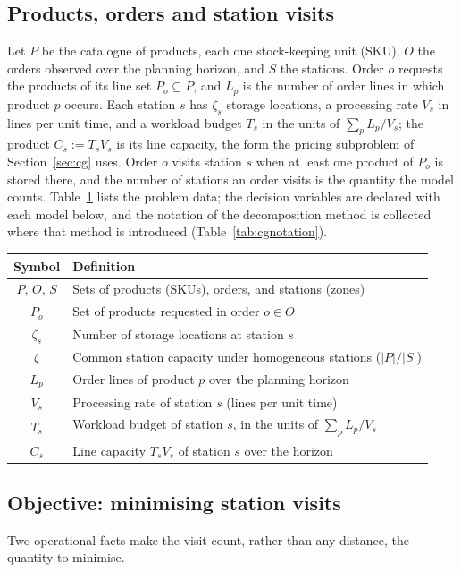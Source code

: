 \documentclass[]{interact}
\begin{document}
\subsection{Products, orders and station visits}\label{sec:sets}
Let $P$ be the catalogue of products, each one stock-keeping unit (SKU), $O$ the orders observed over the planning horizon, and $S$ the stations. Order $o$ requests the products of its line set $P_o \subseteq P$, and $L_p$ is the number of order lines in which product $p$ occurs. Each station $s$ has $\zeta_s$ storage locations, a processing rate $V_s$ in lines per unit time, and a workload budget $T_s$ in the units of $\sum_{p} L_p/V_s$; the product $C_s := T_s V_s$ is its line capacity, the form the pricing subproblem of Section~\ref{sec:cg} uses. Order $o$ visits station $s$ when at least one product of $P_o$ is stored there, and the number of stations an order visits is the quantity the model counts. Table~\ref{tab:data} lists the problem data; the decision variables are declared with each model below, and the notation of the decomposition method is collected where that method is introduced (Table~\ref{tab:cgnotation}).

\begin{table}[H]
\centering
{}
{\small\begin{tabularx}{\textwidth}{@{}c@{\hspace{2em}}X@{}}
\toprule
Symbol & Definition \\
\midrule
$P,\,O,\,S$ & Sets of products (SKUs), orders, and stations (zones) \\
$P_o$       & Set of products requested in order $o \in O$ \\
$\zeta_s$   & Number of storage locations at station $s$ \\
$\zeta$     & Common station capacity under homogeneous stations ($|P|/|S|$) \\
$L_p$       & Order lines of product $p$ over the planning horizon \\
$V_s$       & Processing rate of station $s$ (lines per unit time) \\
$T_s$       & Workload budget of station $s$, in the units of $\sum_p L_p/V_s$ \\
$C_s$       & Line capacity $T_s V_s$ of station $s$ over the horizon \\
\bottomrule
\end{tabularx}}
\label{tab:data}
\end{table}

\subsection{Objective: minimising station visits}\label{sec:objective}
Two operational facts make the visit count, rather than any distance, the quantity to minimise.
\end{document}
